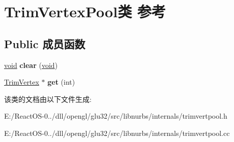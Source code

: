 \hypertarget{class_trim_vertex_pool}{}\section{Trim\+Vertex\+Pool类 参考}
\label{class_trim_vertex_pool}
\subsection*{Public 成员函数}
\begin{DoxyCompactItemize}
\item 
\mbox{\label{class_trim_vertex_pool_ae55ff0ab9b02713c4e3d9013b9276e30}} 
\hyperlink{interfacevoid}{void} {\bfseries clear} (\hyperlink{interfacevoid}{void})
\item 
\mbox{\label{class_trim_vertex_pool_a29a4812c2f055e52de2494d6085d56f9}} 
\hyperlink{class_trim_vertex}{Trim\+Vertex} $\ast$ {\bfseries get} (int)
\end{DoxyCompactItemize}


该类的文档由以下文件生成\+:\begin{DoxyCompactItemize}
\item 
E\+:/\+React\+O\+S-\/0../dll/opengl/glu32/src/libnurbs/internals/trimvertpool.\+h\item 
E\+:/\+React\+O\+S-\/0../dll/opengl/glu32/src/libnurbs/internals/trimvertpool.\+cc\end{DoxyCompactItemize}
